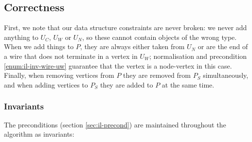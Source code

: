\documentclass{article}
\begin{document}
\subsection{Correctness}

First, we note that our data structure constraints are never broken: we never add anything to $U_C$, $U_W$ or $U_N$, so these cannot contain objects of the wrong type.  When we add things to $P$, they are always either taken from $U_N$ or are the end of a wire that does not terminate in a vertex in $U_W$; normalisation and precondition \ref{enum:il-inv-wire-uw} guarantee that the vertex is a node-vertex in this case.  Finally, when removing vertices from $P$ they are removed from $P_S$ simultaneously, and when adding vertices to $P_S$ they are added to $P$ at the same time.

\subsubsection{Invariants}

The preconditions (section \ref{sec:il-precond}) are maintained throughout the algorithm as invariants:
\end{document}
